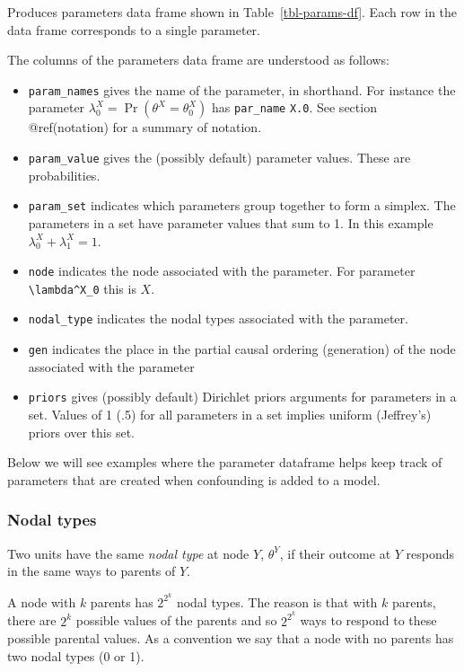\documentclass[
  11pt,
  article]{jss}
\providecommand{\tightlist}{%
  \setlength{\itemsep}{0pt}\setlength{\parskip}{0pt}}\usepackage{longtable,booktabs,array}
\begin{document}
Produces parameters data frame shown in Table~\ref{tbl-params-df}. Each
row in the data frame corresponds to a single parameter.

The columns of the parameters data frame are understood as follows:

\begin{itemize}
\tightlist
\item
  \texttt{param\_names} gives the name of the parameter, in shorthand.
  For instance the parameter
  \(\lambda^X_0 = \Pr(\theta^X = \theta^X_0)\) has \texttt{par\_name}
  \texttt{X.0}. See section @ref(notation) for a summary of notation.
\item
  \texttt{param\_value} gives the (possibly default) parameter values.
  These are probabilities.\\
\item
  \texttt{param\_set} indicates which parameters group together to form
  a simplex. The parameters in a set have parameter values that sum to
  1. In this example \(\lambda^X_0 + \lambda^X_1 = 1\).
\item
  \texttt{node} indicates the node associated with the parameter. For
  parameter \texttt{\textbackslash{}lambda\^{}X\_0} this is \(X\).
\item
  \texttt{nodal\_type} indicates the nodal types associated with the
  parameter.
\item
  \texttt{gen} indicates the place in the partial causal ordering
  (generation) of the node associated with the parameter
\item
  \texttt{priors} gives (possibly default) Dirichlet priors arguments
  for parameters in a set. Values of 1 (.5) for all parameters in a set
  implies uniform (Jeffrey's) priors over this set.
\end{itemize}

Below we will see examples where the parameter dataframe helps keep
track of parameters that are created when confounding is added to a
model.

\hypertarget{sec-nodal-types}{%
\subsubsection{Nodal types}\label{sec-nodal-types}}

Two units have the same \emph{nodal type} at node \(Y\), \(\theta^Y\),
if their outcome at \(Y\) responds in the same ways to parents of \(Y\).

A node with \(k\) parents has \(2^{2^k}\) nodal types. The reason is
that with \(k\) parents, there are \(2^k\) possible values of the
parents and so \(2^{2^k}\) ways to respond to these possible parental
values. As a convention we say that a node with no parents has two nodal
types (0 or 1).
\end{document}
